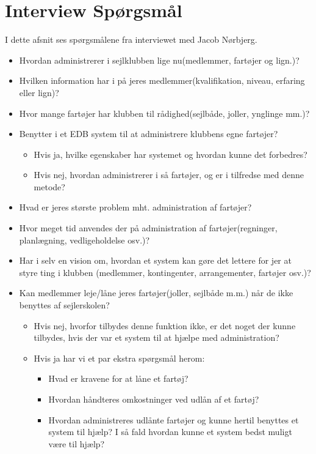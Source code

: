 \chapter{Interview Spørgsmål} \label{questions}
I dette afsnit ses spørgsmålene fra interviewet med Jacob Nørbjerg.

\begin{itemize}
\item Hvordan administrerer i sejlklubben lige nu(medlemmer, fartøjer og lign.)?
\item Hvilken information har i på jeres medlemmer(kvalifikation, niveau, erfaring eller lign)?
\item Hvor mange fartøjer har klubben til rådighed(sejlbåde, joller, ynglinge mm.)?
\item Benytter i et EDB system til at administrere klubbens egne fartøjer?
	\begin{itemize}
	\item Hvis ja, hvilke egenskaber har systemet og hvordan kunne det forbedres?
	\item Hvis nej, hvordan administrerer i så fartøjer, og er i tilfredse med denne metode?
	\end{itemize}
\item Hvad er jeres største problem mht. administration af fartøjer?
\item Hvor meget tid anvendes der på administration af fartøjer(regninger, planlægning, vedligeholdelse osv.)?
\item Har i selv en vision om, hvordan et system kan gøre det lettere for jer at styre ting i klubben (medlemmer, kontingenter, arrangementer, fartøjer osv.)?
\item Kan medlemmer leje/låne jeres fartøjer(joller, sejlbåde m.m.) når de ikke benyttes af sejlerskolen?
	\begin{itemize}
	\item Hvis nej, hvorfor tilbydes denne funktion ikke, er det noget der kunne tilbydes, hvis der var et system til at hjælpe med administration?
	\item Hvis ja har vi et par ekstra spørgsmål herom:
		\begin{itemize}
		\item Hvad er kravene for at låne et fartøj?
		\item Hvordan håndteres omkostninger ved udlån af et fartøj?
		\item Hvordan administreres udlånte fartøjer og kunne hertil benyttes et system til hjælp? I så fald hvordan kunne et system bedst muligt være til hjælp?
		\end{itemize}
	\end{itemize}
\end{itemize}
